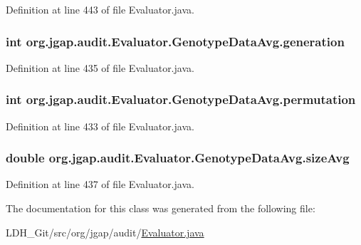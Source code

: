 Definition at line 443 of file Evaluator.\-java.

\hypertarget{classorg_1_1jgap_1_1audit_1_1_evaluator_1_1_genotype_data_avg_aad230ff5a2d3d6dc0b9ac23c6a1bf32b}{
\subsubsection[{generation}]{\setlength{\rightskip}{0pt plus 5cm}int org.\-jgap.\-audit.\-Evaluator.\-Genotype\-Data\-Avg.\-generation}}\label{classorg_1_1jgap_1_1audit_1_1_evaluator_1_1_genotype_data_avg_aad230ff5a2d3d6dc0b9ac23c6a1bf32b}


Definition at line 435 of file Evaluator.\-java.

\hypertarget{classorg_1_1jgap_1_1audit_1_1_evaluator_1_1_genotype_data_avg_a3b75f5017889ef77065a0644c5c4fbdc}{
\subsubsection[{permutation}]{\setlength{\rightskip}{0pt plus 5cm}int org.\-jgap.\-audit.\-Evaluator.\-Genotype\-Data\-Avg.\-permutation}}\label{classorg_1_1jgap_1_1audit_1_1_evaluator_1_1_genotype_data_avg_a3b75f5017889ef77065a0644c5c4fbdc}


Definition at line 433 of file Evaluator.\-java.

\hypertarget{classorg_1_1jgap_1_1audit_1_1_evaluator_1_1_genotype_data_avg_af4a68ef049ea087ebb69f303af4761bb}{
\subsubsection[{size\-Avg}]{\setlength{\rightskip}{0pt plus 5cm}double org.\-jgap.\-audit.\-Evaluator.\-Genotype\-Data\-Avg.\-size\-Avg}}\label{classorg_1_1jgap_1_1audit_1_1_evaluator_1_1_genotype_data_avg_af4a68ef049ea087ebb69f303af4761bb}


Definition at line 437 of file Evaluator.\-java.



The documentation for this class was generated from the following file\-:\begin{DoxyCompactItemize}
\item 
L\-D\-H\-\_\-\-Git/src/org/jgap/audit/\hyperlink{_evaluator_8java}{Evaluator.\-java}\end{DoxyCompactItemize}
